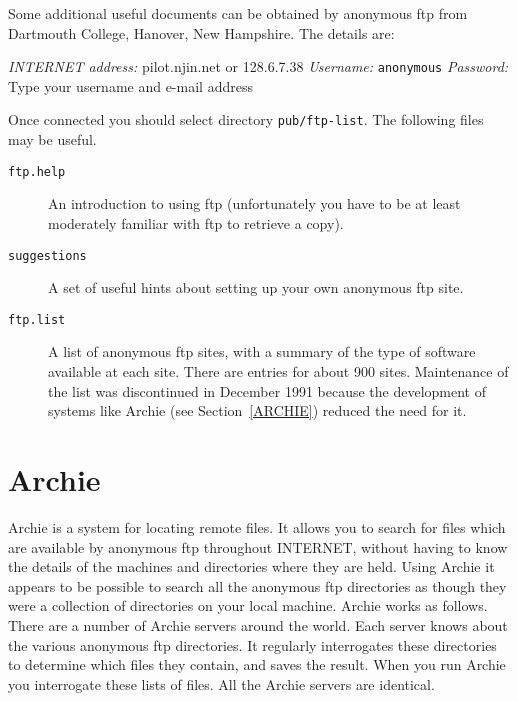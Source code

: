 \documentclass[twoside,11pt,nolof]{starlink}
\begin{document}
Some additional useful documents can be obtained by anonymous ftp
from Dartmouth College, Hanover, New Hampshire. The details are:

\textit{INTERNET address:} pilot.njin.net or 128.6.7.38
\newline \textit{Username:} \verb-anonymous-
\newline \textit{Password:} Type your username and e-mail address

Once connected you should select directory \texttt{pub/ftp-list}. The
following files may be useful.

\begin{description}

  \item[\texttt{ftp.help}] An introduction to using ftp (unfortunately you
   have to be at least moderately familiar with ftp to retrieve a copy).

  \item[\texttt{suggestions}] A set of useful hints about setting up your
   own anonymous ftp site.

  \item[\texttt{ftp.list}] A list of anonymous ftp sites, with a summary of
   the type of software available at each site.  There are entries for
   about 900 sites. Maintenance of the list was discontinued in
   December 1991 because the development of systems like Archie (see
   Section~\ref{ARCHIE}) reduced the need for it.

\end{description}


\section{Archie
\label{ARCHIE}}

Archie is a system for locating remote files. It allows you to search
for files which are available by anonymous ftp throughout INTERNET,
without having to know the details of the machines and directories where
they are held. Using Archie it appears to be possible to search all the
anonymous ftp directories as though they were a collection of
directories on your local machine. Archie works as follows. There are
a number of Archie servers around the world. Each server knows about the
various anonymous ftp directories. It regularly interrogates these
directories to determine which files they contain, and saves the result.
When you run Archie you interrogate these lists of files. All the
Archie servers are identical.
\end{document}
